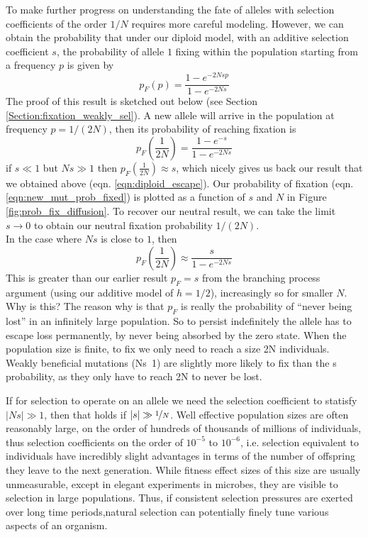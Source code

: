 To make further progress on understanding the fate of alleles with
selection coefficients of the order $1/N$ requires more careful
modeling. However, we can obtain the probability that under our diploid model, with an additive selection coefficient $s$, the
probability of allele $1$ fixing within the population starting
from a frequency $p$ is given by
\begin{equation}
p_F(p) = \frac{1-e^{-2Ns p }}{1-e^{-2Ns}} \label{eqn:prob_fixed}
\end{equation}
The proof of this result is sketched out below (see Section \ref{Section:fixation_weakly_sel}). A new allele will arrive in the population at frequency $p=1/(2N)$,
then its probability of reaching fixation is
\begin{equation}
p_F \left(\frac{1}{2N} \right) = \frac{1-e^{-s }}{1-e^{-2Ns}} \label{eqn:new_mut_prob_fixed}
\end{equation}
if $s \ll1$ but $Ns \gg 1$ then $p_F(\frac{1}{2N}) \approx s$, which
nicely gives
us back our result that we obtained above
(eqn. \eqref{eqn:diploid_escape}). Our probability of fixation
(eqn. \eqref{eqn:new_mut_prob_fixed}) is plotted as a function of $s$
and $N$ in Figure \ref{fig:prob_fix_diffusion}. To recover our neutral
result, we can take the
limit $s \rightarrow 0$ to obtain our neutral fixation
probability $1/(2N)$. \\

In the case where $Ns$ is close to $1$, then
\begin{equation}
p_F \left( \frac{1}{2N} \right) \approx \frac{s}{1-e^{-2Ns}} \label{eqn:escape_from_intro}
\end{equation}
This is greater than our earlier result $p_F=s$ from the branching process
argument (using our additive model of $h=1/2$), increasingly so for smaller $N$. 
Why is this?  The reason why is that $p_F$ is really the probability
of “never being lost” in an infinitely large population. So to persist
indefinitely the allele has to escape loss permanently, by never being
absorbed by the zero state. When the population size is finite, to fix
we only need to reach a size 2N individuals. Weakly beneficial
mutations (Ns~1) are slightly more likely to fix than the s
probability, as they only have to reach 2N to never be lost.

If for selection to operate on an allele we need the selection coefficient to statisfy
$|Ns|\gg 1$, then that holds if $|s|\gg \nicefrac{1}{N}$. 
Well effective population sizes are often reasonably large, on the
order of hundreds of thousands of millions of individuals, thus selection
coefficients on the order of $10^{-5}$ to $10^{-6}$, i.e. selection
equivalent to individuals have incredibly slight advantages in terms
of the number of offspring they leave to the next generation.
While fitness effect sizes of this size are usually unmeasurable,
except in elegant experiments in microbes, they are visible to
selection in large populations. Thus, if consistent selection pressures are exerted over long
time periods,natural selection can potentially finely tune various
aspects of an organism.

